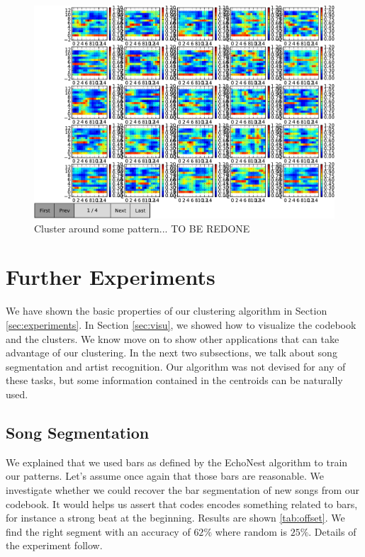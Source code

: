 \documentclass{article}
\begin{document}
\begin{figure}[htb]
\begin{center}
\includegraphics[width=.9\columnwidth]{close_patterns1}
\end{center}
\caption{\small{Cluster around some pattern... TO BE REDONE}}
\label{fig:cluster}
\end{figure}

\section{Further Experiments}\label{sec:exps2}
We have shown the basic properties of our clustering algorithm in
Section \ref{sec:experiments}. In Section \ref{sec:visu}, we showed
how to visualize the codebook and the clusters. We know move on to
show other applications that can take advantage of our clustering.
In the next two subsections, we talk about song segmentation and
artist recognition. Our algorithm was not devised for any of these tasks,
but some information contained in the centroids can be naturally used.

\subsection{Song Segmentation}
We explained that we used bars as defined by the EchoNest algorithm to
train our patterns. Let's assume once again that those bars are
reasonable. We investigate whether we could recover the bar segmentation
of new songs from our codebook. It would helps us assert that codes
encodes something related to bars, for instance a strong beat at the
beginning. Results are shown \ref{tab:offset}. We find the right segment
with an accuracy of $62\%$ where random is $25\%$. Details of the
experiment follow.
\end{document}
